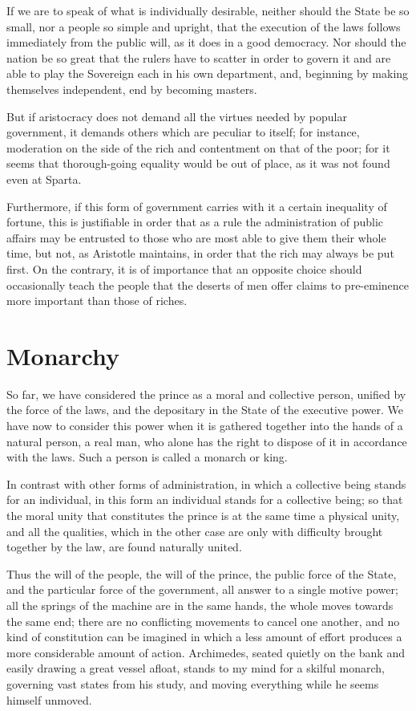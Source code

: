 \documentclass[12pt]{book}
\begin{document}
If we are to speak of what is individually desirable, neither should the State be so small, nor a people so simple and upright, that the execution of the laws follows immediately from the public will, as it does in a good democracy. Nor should the nation be so great that the rulers have to scatter in order to govern it and are able to play the Sovereign each in his own department, and, beginning by making themselves independent, end by becoming masters.

But if aristocracy does not demand all the virtues needed by popular government, it demands others which are peculiar to itself; for instance, moderation on the side of the rich and contentment on that of the poor; for it seems that thorough-going equality would be out of place, as it was not found even at Sparta.

Furthermore, if this form of government carries with it a certain inequality of fortune, this is justifiable in order that as a rule the administration of public affairs may be entrusted to those who are most able to give them their whole time, but not, as Aristotle maintains, in order that the rich may always be put first. On the contrary, it is of importance that an opposite choice should occasionally teach the people that the deserts of men offer claims to pre-eminence more important than those of riches.

\section{Monarchy}
So far, we have considered the prince as a moral and collective person, unified by the force of the laws, and the depositary in the State of the executive power. We have now to consider this power when it is gathered together into the hands of a natural person, a real man, who alone has the right to dispose of it in accordance with the laws. Such a person is called a monarch or king.

In contrast with other forms of administration, in which a collective being stands for an individual, in this form an individual stands for a collective being; so that the moral unity that constitutes the prince is at the same time a physical unity, and all the qualities, which in the other case are only with difficulty brought together by the law, are found naturally united.

Thus the will of the people, the will of the prince, the public force of the State, and the particular force of the government, all answer to a single motive power; all the springs of the machine are in the same hands, the whole moves towards the same end; there are no conflicting movements to cancel one another, and no kind of constitution can be imagined in which a less amount of effort produces a more considerable amount of action. Archimedes, seated quietly on the bank and easily drawing a great vessel afloat, stands to my mind for a skilful monarch, governing vast states from his study, and moving everything while he seems himself unmoved.
\end{document}
